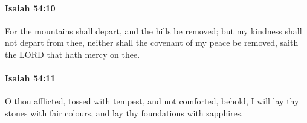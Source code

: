 		\paragraph{Isaiah 54:10} %
			\label{ISAIAH-54-10}

			For the mountains shall depart, and the hills be removed; but my kindness shall not depart from thee, neither shall the covenant of my peace be removed, saith the LORD that hath mercy on thee.


		\paragraph{Isaiah 54:11} %
			\label{ISAIAH-54-11}

			O thou afflicted, tossed with tempest, and not comforted, behold, I will lay thy stones with fair colours, and lay thy foundations with sapphires.


